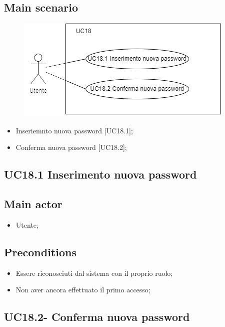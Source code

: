 \documentclass{article}
\begin{document}
     \subsection*{Main scenario}
        \begin{figure}[h]
          \centering
          \includegraphics{documenti/imgUML/UC18-zoom.png}
          \label{fig:immagine}
        \end{figure}
        
        \begin{itemize}
            \item Inseriemnto nuova password [UC18.1];
            \item Conferma nuova password [UC18.2];
        \end{itemize}

        \subsection{UC18.1 Inserimento nuova password}
            \subsection*{Main actor}
        \begin{itemize}
            \item Utente;
        \end{itemize}
        
    \subsection*{Preconditions}
        \begin{itemize}
            \item Essere riconosciuti dal sistema con il proprio ruolo;
            \item Non aver ancora effettuato il primo accesso;
        \end{itemize}

    \subsection{UC18.2- Conferma nuova password}
\end{document}
